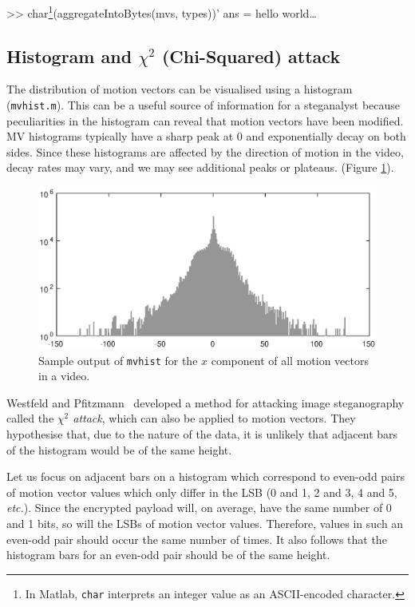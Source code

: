 \documentclass[12pt,british,twoside,notitlepage,usenames,dvipsnames,hypens,final]{report}
\numberwithin{equation}{section}
\numberwithin{figure}{section}
\renewenvironment{alltt}{\vspace{-0.6\baselineskip}\begin{oldalltt}}{\end{oldalltt}\vspace{-0.1\baselineskip}}
\begin{document}
\begin{alltt}
    >> char\footnote{In Matlab, \texttt{char} interprets an integer value as an ASCII-encoded character.}(aggregateIntoBytes(mvs, types))'
    ans = hello world\ldots
\end{alltt}

\subsection{Histogram and $\chi^2$ (Chi-Squared) attack}

The distribution of motion vectors can be visualised using a histogram (\texttt{mvhist.m}). This can be a useful source of information for a steganalyst because peculiarities in the histogram can reveal that motion vectors have been modified. MV histograms typically have a sharp peak at 0 and exponentially decay on both sides. Since these histograms are affected by the direction of motion in the video, decay rates may vary, and we may see additional peaks or plateaus. (Figure \ref{fig:histogram-example}).

\begin{figure}[tbh]
\centerline{\includegraphics[scale=0.75]{img/histogram-example.eps}}
\caption{Sample output of \texttt{mvhist} for the $x$ component of all motion vectors in a video.}
\label{fig:histogram-example}
\end{figure}

Westfeld and Pfitzmann~\cite{westfeld1999attacks} developed a method for attacking image steganography called the \emph{$\chi^2$ attack}, which can also be applied to motion vectors. They hypothesise that, due to the nature of the data, it is unlikely that adjacent bars of the histogram would be of the same height. 

Let us focus on adjacent bars on a histogram which correspond to even-odd pairs of motion vector values which only differ in the LSB (0 and 1, 2 and 3, 4 and 5, \emph{etc.}). Since the encrypted payload will, on average, have the same number of 0 and 1 bits, so will the LSBs of motion vector values. Therefore, values in such an even-odd pair should occur the same number of times. It also follows that the histogram bars for an even-odd pair should be of the same height.
\end{document}
